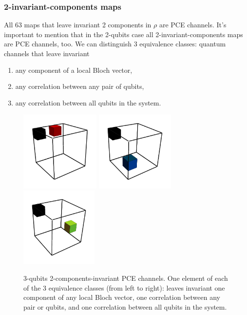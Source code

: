 \documentclass[11pt,dvipsnames]{article} %
\newcommand{\1}{\mathds{1}}
\begin{document}
\subsubsection*{2-invariant-components maps}%
All 63 maps that leave invariant 2 components in $\rho$ are 
PCE channels. It's important to mention that in the 2-qubits case all 
2-invariant-components maps are PCE channels, too. We can distinguish
3 equivalence classes: quantum channels that leave invariant
\begin{enumerate}
	\item any component of a local Bloch vector,
	\item any correlation between any pair of qubits,
	\item any correlation between all qubits in the system.
\end{enumerate}
\begin{figure}[H]
	\centering
	\hfill \hfill
	\includegraphics[height=4cm]{3q-2c-1}
	\hfill
	\includegraphics[height=4cm]{3q-2c-2}
	\hfill
	\includegraphics[height=4cm]{3q-2c-3}
	\hfill \hfill
	\caption{3-qubits 2-components-invariant PCE channels. 
	One element of each of the 3 equivalence classes 
	(from left to right): leaves invariant one component of any local
	Bloch vector, one correlation between any pair or qubits, and 
	one correlation between all qubits in the system.}
	\label{fig:QC-3q-2c}
\end{figure}
\end{document}
